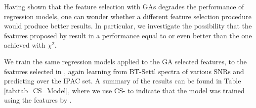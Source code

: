Having shown that the feature selection with GAs degrades the
performance of regression models, one can wonder whether a different
feature selection procedure would produce better results. In
particular, we investigate the possibility that the features proposed
by \cite{cesetti} result in a performance equal to or even better than
the one achieved with $\chi^2$.


We train the same regression models applied to the GA selected
features, to the features selected in \cite{cesetti}, again learning
from BT-Settl spectra of various SNRs and predicting over the IPAC
set. A summary of the results can be found in Table
\ref{tab:tab_CS_Model}, where we use CS- to indicate that the model was
trained using the features by \cite{cesetti}.

